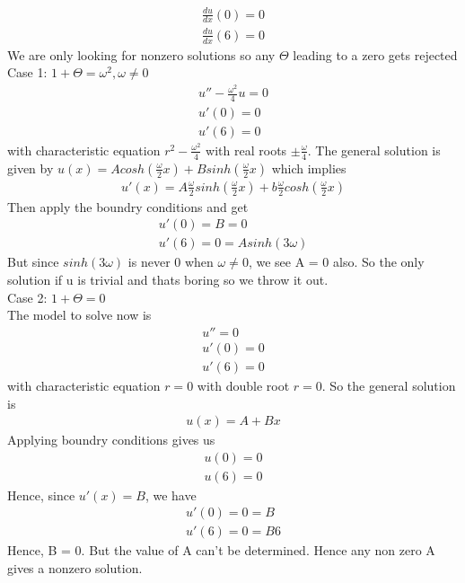 \documentclass[11pt]{SelfArxOneColBMN}
\begin{document}
\begin{exercise}
\begin{solution}
\begin{eqnarray*}
      \frac{du}{dx}(0) = 0\\
      \frac{du}{dx}(6) = 0
    \end{eqnarray*}
    We are only looking for nonzero solutions so any $\Theta$ leading to a zero gets rejected\\
    Case 1: $1 + \Theta = \omega^2, \omega \neq 0$
    \begin{eqnarray*}
      u'' - \frac{\omega^2}{4}u = 0\\
      u'(0) = 0\\
      u'(6) = 0
    \end{eqnarray*}
    with characteristic equation $r^2 - \frac{\omega^2}{4}$ with real roots $\pm \frac{\omega}{4}$. The general solution is given by $u(x) = Acosh(\frac{\omega}{2}x) + Bsinh(\frac{\omega}{2}x)$ which implies
    \begin{eqnarray*}
     u'(x) = A\frac{\omega}{2}sinh(\frac{\omega}{2}x) +  b\frac{\omega}{2}cosh(\frac{\omega}{2}x)
    \end{eqnarray*}
    Then apply the boundry conditions and get
    \begin{eqnarray*}
      u'(0) = B = 0\\
      u'(6) = 0 = Asinh(3\omega)
    \end{eqnarray*}
    But since $sinh(3\omega)$ is never 0 when $\omega \neq 0$, we see A = 0 also. So the only solution if u is trivial and thats boring so we throw it out.\\
    Case 2: $1 + \Theta = 0$\\
    The model to solve now is
    \begin{eqnarray*}
      u'' = 0\\
      u'(0) = 0\\
      u'(6) = 0
    \end{eqnarray*}
    with characteristic equation $r = 0$ with double root $r = 0$. So the general solution is
    \begin{eqnarray*}
      u(x) = A + Bx
    \end{eqnarray*}
    Applying boundry conditions gives us
    \begin{eqnarray*}
      u(0) = 0\\
      u(6) = 0
    \end{eqnarray*}
    Hence, since $u'(x) = B$, we have
    \begin{eqnarray*}
      u'(0) = 0 = B\\
      u'(6) = 0 = B6
    \end{eqnarray*}
    Hence, B = 0. But the value of A can't be determined. Hence any non zero A gives a nonzero solution.\\

\end{solution}
\end{exercise}
\end{document}
